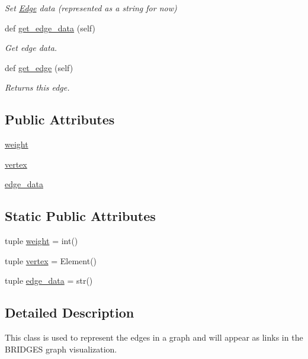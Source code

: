 \begin{DoxyCompactItemize}
\begin{DoxyCompactList}\small\item\em Set \hyperlink{class_bridges_1_1edge_1_1_edge}{Edge} data (represented as a string for now) \end{DoxyCompactList}\item 
def \hyperlink{class_bridges_1_1edge_1_1_edge_a37f3fa415dc037ee5ef32aafc3c24792}{get\+\_\+edge\+\_\+data} (self)
\begin{DoxyCompactList}\small\item\em Get edge data. \end{DoxyCompactList}\item 
def \hyperlink{class_bridges_1_1edge_1_1_edge_a00fbdf3e8b0e05e00647cd2a32b25beb}{get\+\_\+edge} (self)
\begin{DoxyCompactList}\small\item\em Returns this edge. \end{DoxyCompactList}\end{DoxyCompactItemize}
\subsection*{Public Attributes}
\begin{DoxyCompactItemize}
\item 
\hyperlink{class_bridges_1_1edge_1_1_edge_a36787799fbbb1cd17fe1944d92513524}{weight}
\item 
\hyperlink{class_bridges_1_1edge_1_1_edge_a785d6e63ec4a7ec1b49c9e4a81a802dc}{vertex}
\item 
\hyperlink{class_bridges_1_1edge_1_1_edge_a7677bdbf69f6a1725be3bb79e2bb1c7e}{edge\+\_\+data}
\end{DoxyCompactItemize}
\subsection*{Static Public Attributes}
\begin{DoxyCompactItemize}
\item 
tuple \hyperlink{class_bridges_1_1edge_1_1_edge_a4fb568704945fe2cc8fbb1f5c5e807cd}{weight} = int()
\item 
tuple \hyperlink{class_bridges_1_1edge_1_1_edge_a1cded0b08960b1a7fa0d8c1505315651}{vertex} = Element()
\item 
tuple \hyperlink{class_bridges_1_1edge_1_1_edge_a982756166f2c8c6321a060cc377f2c04}{edge\+\_\+data} = str()
\end{DoxyCompactItemize}


\subsection{Detailed Description}
This class is used to represent the edges in a graph and will appear as links in the B\+R\+I\+D\+G\+E\+S graph visualization. 

